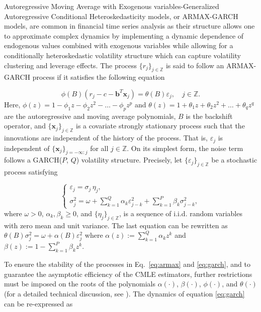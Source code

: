 \documentclass[10pt,a4paper,oneside]{article}
\newcommand{\Z}{\mathbb{Z}}
\begin{document}
Autoregressive Moving Average with Exogenous variables-Generalized Autoregressive Conditional Heteroskedasticity models, or ARMAX-GARCH models, are common in financial time series analysis as their structure allows one to approximate complex dynamics by implementing a dynamic dependence of endogenous values combined with exogenous variables while allowing for a conditionally heteroskedastic volatility structure which can capture volatility clustering and leverage effects. The process $\{r_j\}_{j \in \Z}$ is said to follow an ARMAX-GARCH process if it satisfies the following equation

\begin{equation}
    \phi(B) \left( r_j - c - \mathbf{b}^T \mathbf{x}_j \right) = \theta(B) \varepsilon_j, \quad j \in \Z.
    \label{eq:armax}
\end{equation}
Here, $\phi(z) = 1 - \phi_1 z - \phi_2 z^2 - \dots - \phi_p z^p$ and $\theta(z) = 1 + \theta_1 z + \theta_2 z^2 + \dots + \theta_q z^q$ are the autoregressive and moving average polynomials, $B$ is the backshift operator, and $\{ \mathbf{x}_j \}_{j \in \Z}$ is a covariate strongly stationary process such that the innovations are independent of the history of the process. That is, $\varepsilon_j$ is independent of $\{ \mathbf{x}_j \}_{j = - \infty : j}$ for all $j \in \Z$. On its simplest form, the noise term follows a GARCH($P$, $Q$) volatility structure. Precisely, let $\{ \varepsilon_j \}_{j \in \Z}$ be a stochastic process satisfying

\begin{equation}
    \begin{cases}
        \varepsilon_j = \sigma_j \,\eta_j, \\[6pt]
        \sigma_j^2 = \omega + \sum^{Q}_{k = 1} \alpha_k \varepsilon^2_{j - k} + \sum^P_{k = 1} \beta_k \sigma_{j - k}^2,
    \end{cases}
    \label{eq:garch}
\end{equation}
where $\omega > 0$, $\alpha_k, \beta_k \geq 0$, and $\{ \eta_j\}_{j \in \Z}$, is a sequence of i.i.d. random variables with zero mean and unit variance. The last equation can be rewritten as $\theta(B) \sigma^2_j = \omega + \alpha(B) \varepsilon^2_j$ where $\alpha(z) := \sum^Q_{k = 1} \alpha_k z^k$ and $\beta(z) := 1 - \sum^P_{k = 1} \beta_k z^k$.

To ensure the stability of the processes in Eq.~\eqref{eq:armax} and \eqref{eq:garch}, and to guarantee the asymptotic efficiency of the CMLE estimators, further restrictions must be imposed on the roots of the polynomials $\alpha(\cdot)$, $\beta(\cdot)$, $\phi(\cdot)$, and $\theta(\cdot)$ (for a detailed technical discussion, see \cite{mejia2026asymptotic}). The dynamics of equation \eqref{eq:garch} can be re-expressed as
\end{document}
